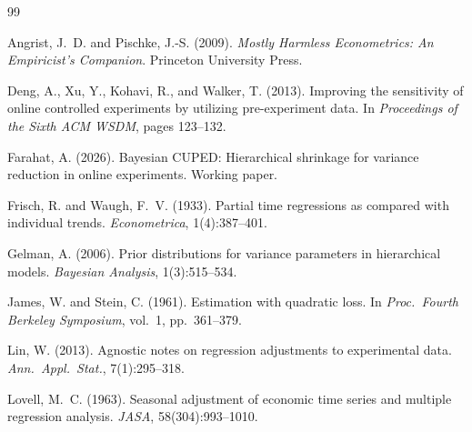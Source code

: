 \documentclass[11pt,letterpaper]{article}
\begin{document}
\begin{thebibliography}{99}

Angrist, J.~D. and Pischke, J.-S. (2009).
\newblock \emph{Mostly Harmless Econometrics: An Empiricist's Companion}.
\newblock Princeton University Press.

Deng, A., Xu, Y., Kohavi, R., and Walker, T. (2013).
\newblock Improving the sensitivity of online controlled experiments by
  utilizing pre-experiment data.
\newblock In \emph{Proceedings of the Sixth ACM WSDM}, pages 123--132.

Farahat, A. (2026).
\newblock Bayesian {CUPED}: Hierarchical shrinkage for variance reduction in
  online experiments.
\newblock Working paper.

Frisch, R. and Waugh, F.~V. (1933).
\newblock Partial time regressions as compared with individual trends.
\newblock \emph{Econometrica}, 1(4):387--401.

Gelman, A. (2006).
\newblock Prior distributions for variance parameters in hierarchical models.
\newblock \emph{Bayesian Analysis}, 1(3):515--534.

James, W. and Stein, C. (1961).
\newblock Estimation with quadratic loss.
\newblock In \emph{Proc.\ Fourth Berkeley Symposium}, vol.~1, pp.~361--379.

Lin, W. (2013).
\newblock Agnostic notes on regression adjustments to experimental data.
\newblock \emph{Ann.\ Appl.\ Stat.}, 7(1):295--318.

Lovell, M.~C. (1963).
\newblock Seasonal adjustment of economic time series and multiple regression
  analysis.
\newblock \emph{JASA}, 58(304):993--1010.

\end{thebibliography}
\end{document}

